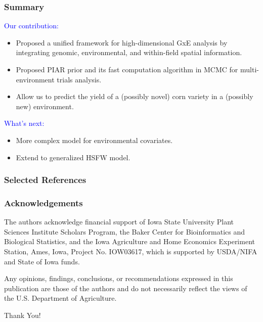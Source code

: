 \documentclass{beamer}
\begin{document}
\begin{frame}
	\frametitle{Summary}
\textcolor{blue}{Our contribution:}
	\begin{itemize}
	\item Proposed a unified framework for high-dimensional GxE analysis by integrating genomic, environmental, and within-field spatial information.
	\item Proposed PIAR prior and its fast computation algorithm in MCMC for multi-environment trials analysis.
	\item Allow us to predict the yield of a (possibly novel) corn variety in a (possibly new) environment.
	\end{itemize}
	
\textcolor{blue}{What's next:}
		\begin{itemize}
	\item More complex model for environmental covariates.
	\item Extend to generalized HSFW model.
	\end{itemize}
	
\end{frame}







\begin{frame}
\frametitle{Selected References}


\end{frame}



\begin{frame}
\frametitle{Acknowledgements}
The authors acknowledge financial support of Iowa State University Plant Sciences Institute Scholars Program, the Baker Center for Bioinformatics and Biological Statistics, and the Iowa Agriculture and Home Economics Experiment Station, Ames, Iowa, Project No. IOW03617, which is supported by USDA/NIFA and State of Iowa funds. 


Any opinions, findings, conclusions, or recommendations expressed in this publication are those of the authors and do not necessarily reflect the views of the U.S. Department of Agriculture.
\end{frame}




\begin{frame}%
\begin{center}
\Huge Thank You!
\end{center}
\end{frame}
\end{document}
